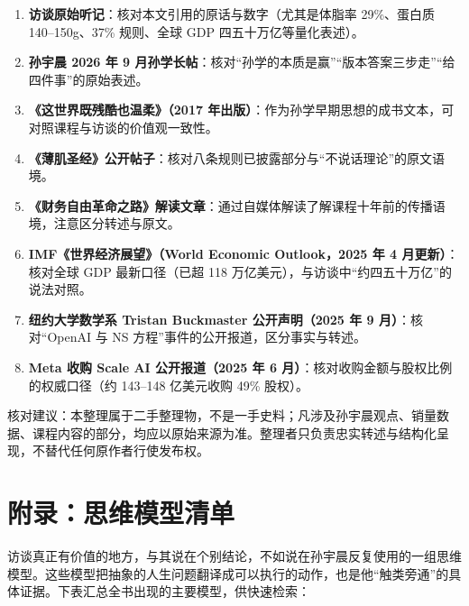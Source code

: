 \begin{enumerate}
\def\labelenumi{\arabic{enumi}.}
\tightlist
\item
  \textbf{访谈原始听记}：核对本文引用的原话与数字（尤其是体脂率
  29\%、蛋白质 140--150g、37\% 规则、全球 GDP 四五十万亿等量化表述）。
\item
  \textbf{孙宇晨 2026 年 9
  月孙学长帖}：核对``孙学的本质是赢''``版本答案三步走''``给四件事''的原始表述。
\item
  \textbf{《这世界既残酷也温柔》（2017
  年出版）}：作为孙学早期思想的成书文本，可对照课程与访谈的价值观一致性。
\item
  \textbf{《薄肌圣经》公开帖子}：核对八条规则已披露部分与``不说话理论''的原文语境。
\item
  \textbf{《财务自由革命之路》解读文章}：通过自媒体解读了解课程十年前的传播语境，注意区分转述与原文。
\item
  \textbf{IMF《世界经济展望》（World Economic Outlook，2025 年 4
  月更新）}：核对全球 GDP 最新口径（已超 118
  万亿美元），与访谈中``约四五十万亿''的说法对照。
\item
  \textbf{纽约大学数学系 Tristan Buckmaster 公开声明（2025 年 9
  月）}：核对``OpenAI 与 NS 方程''事件的公开报道，区分事实与转述。
\item
  \textbf{Meta 收购 Scale AI 公开报道（2025 年 6
  月）}：核对收购金额与股权比例的权威口径（约 143--148 亿美元收购 49\%
  股权）。
\end{enumerate}

核对建议：本整理属于二手整理物，不是一手史料；凡涉及孙宇晨观点、销量数据、课程内容的部分，均应以原始来源为准。整理者只负责忠实转述与结构化呈现，不替代任何原作者行使发布权。

\section{附录：思维模型清单}

访谈真正有价值的地方，与其说在个别结论，不如说在孙宇晨反复使用的一组思维模型。这些模型把抽象的人生问题翻译成可以执行的动作，也是他``触类旁通''的具体证据。下表汇总全书出现的主要模型，供快速检索：

